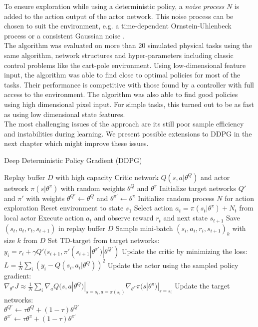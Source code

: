 To ensure exploration while using a deterministic policy, a \textit{noise process} $\mathit{N}$ is added to the action output of the actor network. This noise process can be chosen to suit the environment, e.g. a time-dependent Ornstein-Uhlenbeck process \citep{ricciardi1979ornstein} or a consistent Gaussian noise \citep{barth2018distributed}.\\
The algorithm was evaluated on more than 20 simulated physical tasks using the same algorithm, network structures and hyper-parameters including classic control problems like the cart-pole environment. Using low-dimensional feature input, the algorithm was able to find close to optimal policies for most of the tasks. Their performance is competitive with those found by a controller with full access to the environment. The algorithm was also able to find good policies using high dimensional pixel input. For simple tasks, this turned out to be as fast as using low dimensional state features.\\
The most challenging issues of the approach are its still poor sample efficiency and instabilities during learning. We present possible extensions to DDPG in the next chapter which might improve these issues.
\begin{algorithm} [H]
	\caption{Deep Deterministic Policy Gradient (DDPG)}\label{DDPG-algo}
	\begin{algorithmic}[1]
		\REQUIRE Replay buffer $\mathit{D}$ with high capacity
		\REQUIRE Critic network $Q(s,a|\theta^Q)$ and actor network $\pi(s|\theta^\pi)$ with random weights $\theta^Q$ and $\theta^\pi$
		\REQUIRE Initialize target networks $Q'$ and $\pi'$ with weights $\theta^{Q'}\leftarrow\theta^Q$ and $\theta^{\pi'}\leftarrow\theta^\pi$
		\STATE Initialize random process $\mathit{N}$ for action exploration
		\STATE Reset environment to state $s_1$
		\STATE Select action $a_t = \pi(s_t|\theta^\pi) + \mathit{N}_t$ from local actor
		\STATE Execute action $a_t$ and observe reward $r_t$ and next state $s_{t+1}$
		\STATE Save $(s_t, a_t, r_t,s_{t+1})$ in replay buffer $D$
		\STATE Sample mini-batch $(s_i, a_i, r_i,s_{i+1})_k$ with size $k$ from $D$
		\STATE Set TD-target from target networks:\\
		\qquad $y_i = r_i + \gamma Q'(s_{i+1}, \pi'(s_{i+1}|\theta^{\pi'})|\theta^{Q'})$
		\STATE Update the critic by minimizing the loss:\\
		\qquad $L=\frac{1}{N}\sum_i(y_i - Q(s_i,a_i|\theta^Q))^2$
		\STATE Update the actor using the sampled policy gradient:\\ 			\qquad $\nabla_{\theta^\pi}J \approx \frac{1}{N} \sum_i \nabla_a Q(s,a|\theta^Q)|_{s=s_i, a=\pi(s_i)}\nabla_{\theta^\pi}\pi(s|\theta^\pi)|_{s=s_i}$
		\STATE Update the target networks:\\
		\qquad $\theta^{Q'}\leftarrow \tau \theta^Q + (1-\tau)\theta^{Q'}$\\
		\qquad $\theta^{\pi'}\leftarrow \tau \theta^\pi + (1-\tau)\theta^{\pi'}$
		\ENDFOR
		\ENDFOR
	\end{algorithmic}
\end{algorithm}



